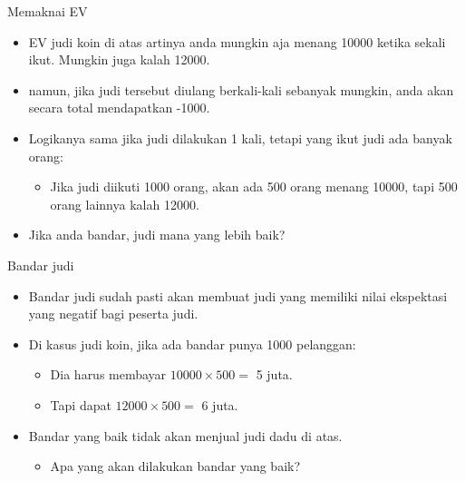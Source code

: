 \documentclass[
  ignorenonframetext,
]{beamer}
\providecommand{\tightlist}{%
  \setlength{\itemsep}{0pt}\setlength{\parskip}{0pt}}\usepackage{longtable,booktabs,array}
\begin{document}
\begin{frame}{Memaknai EV}
\label{memaknai-ev}
\begin{itemize}[<+->]
\item
  EV judi koin di atas artinya anda mungkin aja menang 10000 ketika
  sekali ikut. Mungkin juga kalah 12000.
\item
  namun, jika judi tersebut diulang berkali-kali sebanyak mungkin, anda
  akan secara total mendapatkan -1000.
\item
  Logikanya sama jika judi dilakukan 1 kali, tetapi yang ikut judi ada
  banyak orang:

  \begin{itemize}[<+->]
  \tightlist
  \item
    Jika judi diikuti 1000 orang, akan ada 500 orang menang 10000, tapi
    500 orang lainnya kalah 12000.
  \end{itemize}
\item
  Jika anda bandar, judi mana yang lebih baik?
\end{itemize}
\end{frame}

\begin{frame}{Bandar judi}
\label{bandar-judi}
\begin{itemize}
\item
  Bandar judi sudah pasti akan membuat judi yang memiliki nilai
  ekspektasi yang negatif bagi peserta judi.
\item
  Di kasus judi koin, jika ada bandar punya 1000 pelanggan:

  \begin{itemize}
  \item
    Dia harus membayar \(10000 \times 500=\) 5 juta.
  \item
    Tapi dapat \(12000 \times 500=\) 6 juta.
  \end{itemize}
\item
  Bandar yang baik tidak akan menjual judi dadu di atas.

  \begin{itemize}
  \tightlist
  \item
    Apa yang akan dilakukan bandar yang baik?
  \end{itemize}
\end{itemize}
\end{frame}
\end{document}
